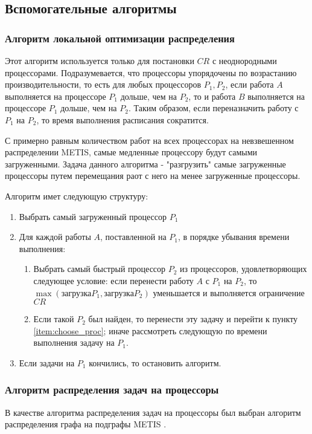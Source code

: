 \subsection{Вспомогательные алгоритмы}

\subsubsection{Алгоритм локальной оптимизации распределения} \label{partition_optimization}

Этот алгоритм используется только для постановки $CR$ с неоднородными процессорами. Подразумевается, что процессоры упорядочены по возрастанию производительности, то есть для любых процессоров $P_1, P_2$, если работа $A$ выполняется на процессоре $P_1$ дольше, чем на $P_2$, то и работа $B$ выполняется на процессоре $P_1$ дольше, чем на $P_2$. Таким образом, если переназначить работу с $P_1$ на $P_2$, то время выполнения расписания сократится.

С примерно равным количеством работ на всех процессорах на невзвешенном распределении METIS, самые медленные процессору будут самыми загруженными. Задача данного алгоритма - "разгрузить" самые загруженные процессоры путем перемещания раот с него на менее загруженные процессоры. 

Алгоритм имет следующую структуру:
\begin{enumerate}
    \item Выбрать самый загруженный процессор $P_1$
    \item Для каждой работы $A$, поставленной на $P_1$, в порядке убывания времени выполнения:
    \begin{enumerate}
        \item \label{item:choose_proc} Выбрать самый быстрый процессор $P_2$ из процессоров, удовлетворяющих следующее условие: если перенести работу $A$ с $P_1$ на $P_2$, то $\max(\text{загрузка} P_1, \text{загрузка} P_2)$ уменьшается и выполняется ограничение $CR$
        \item Если такой $P_2$ был найден, то перенести эту задачу и перейти к пункту \ref{item:choose_proc}; иначе рассмотреть следующую по времени выполнения задачу на $P_1$.
    \end{enumerate}
    \item Если задачи на $P_1$ кончились, то остановить алгоритм.
\end{enumerate}

\subsubsection{Алгоритм распределения задач на процессоры} \label{METIS}
В качестве алгоритма распределения задач на процессоры был выбран алгоритм распределения графа на подграфы METIS \cite{Karypis2011}. 


